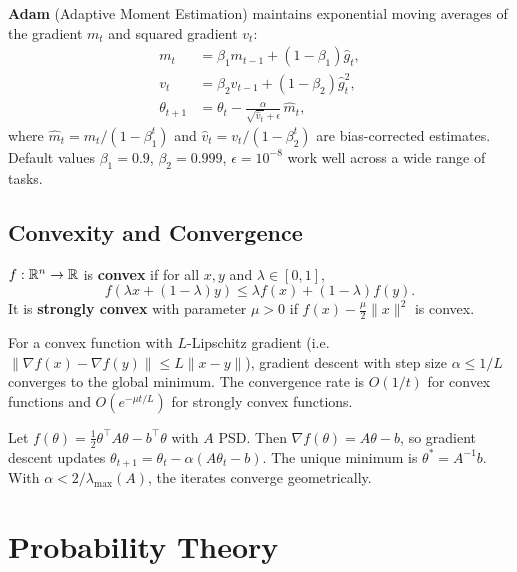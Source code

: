 \textbf{Adam} (Adaptive Moment Estimation) maintains
exponential moving averages of the gradient $m_t$ and squared gradient
$v_t$:
\begin{align*}
    m_t &= \beta_1 m_{t-1} + (1-\beta_1)\hat{g}_t, \\
    v_t &= \beta_2 v_{t-1} + (1-\beta_2)\hat{g}_t^2, \\
    \theta_{t+1} &= \theta_t - \frac{\alpha}{\sqrt{\hat{v}_t}+\epsilon}\,\hat{m}_t,
\end{align*}
where $\hat{m}_t = m_t/(1-\beta_1^t)$ and $\hat{v}_t = v_t/(1-\beta_2^t)$
are bias-corrected estimates.  Default values $\beta_1=0.9$,
$\beta_2=0.999$, $\epsilon=10^{-8}$ work well across a wide range of
tasks.

\subsection*{Convexity and Convergence}

\begin{definition}[Convexity]
\label{def:convexity}
$f: \mathbb{R}^n \to \mathbb{R}$ is \textbf{convex} if for all $x,y$ and
$\lambda \in [0,1]$,
\[
    f(\lambda x + (1-\lambda)y) \leq \lambda f(x) + (1-\lambda)f(y).
\]
It is \textbf{strongly convex} with parameter $\mu > 0$ if
$f(x) - \frac{\mu}{2}\|x\|^2$ is convex.
\end{definition}

For a convex function with $L$-Lipschitz gradient (i.e.
$\|\nabla f(x)-\nabla f(y)\| \leq L\|x-y\|$), gradient descent with
step size $\alpha \leq 1/L$ converges to the global minimum.  The
convergence rate is $O(1/t)$ for convex functions and $O(e^{-\mu t/L})$
for strongly convex functions.

\begin{example}
Let $f(\theta) = \frac{1}{2}\theta^\top A\theta - b^\top\theta$ with $A$
PSD.  Then $\nabla f(\theta) = A\theta - b$, so gradient descent updates
$\theta_{t+1} = \theta_t - \alpha(A\theta_t - b)$.  The unique minimum
is $\theta^* = A^{-1}b$.  With $\alpha < 2/\lambda_{\max}(A)$, the
iterates converge geometrically.
\end{example}

\section{Probability Theory}
\label{app:probability}

